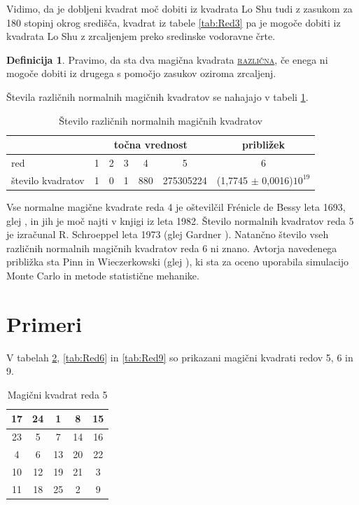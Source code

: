 \documentclass[a4paper,12pt]{article}
\newcommand{\pojem}[1]{\underline{\textsc{#1}}}
\theoremstyle{definition}
\newtheorem{definicija}{Definicija}
\theoremstyle{plain}
\newenvironment{magic}[3]{
   \begin{table}[!ht]%
   \centering%
   \caption{#2}%
   \label{#3}%
   \large
   \begin{tabular}{|*{#1}{c|}}%
      \hline
}{
   \end{tabular}%
   \end{table}%
}
\begin{document}
Vidimo, da je dobljeni kvadrat moč dobiti iz kvadrata Lo Shu tudi z zasukom za
180 stopinj okrog središča, kvadrat iz tabele \ref{tab:Red3} pa je mogoče dobiti
iz kvadrata Lo Shu z zrcaljenjem preko sredinske vodoravne črte.

\begin{definicija}
   Pravimo, da sta dva magična kvadrata \pojem{različna}, če enega ni mogoče dobiti
   iz drugega s pomočjo zasukov oziroma zrcaljenj.
\end{definicija}
\pagebreak

Števila različnih normalnih magičnih kvadratov se nahajajo v tabeli \ref{tab:razlicni}.

\begin{table}[!h]
   \centering
   \caption{Število različnih normalnih magičnih kvadratov}
   \label{tab:razlicni}
   \begin{tabular}{|l|*{6}{c|}}
      \hline
                        & \multicolumn{5}{c|}{točna vrednost} & približek                      \\\hline
      red               & 1 & 2 & 3 & 4   & 5                 & 6                              \\\hline
      število kvadratov & 1 & 0 & 1 & 880 & 275305224         & (1,7745 $\pm$ 0,0016)$10^{19}$ \\\hline
   \end{tabular}
\end{table}

Vse normalne magične kvadrate reda 4 je oštevilčil Frénicle de Bessy
leta 1693, glej \cite{bessy}, in jih je moč najti v knjigi \cite{berlekamp}
iz leta 1982. Število normalnih kvadratov reda 5 je izračunal
R. Schroeppel leta 1973 (glej Gardner \cite{gardner}).
Natančno število vseh različnih normalnih magičnih kvadratov reda 6 ni znano.
Avtorja navedenega približka sta Pinn in Wieczerkowski (glej \cite{pinn}), ki
sta za oceno uporabila simulacijo Monte Carlo in metode statistične mehanike.


\section{Primeri}

V tabelah \ref{tab:Red5}, \ref{tab:Red6} in \ref{tab:Red9} so prikazani
magični kvadrati redov 5, 6 in 9.

\begin{magic}{5}{Magični kvadrat reda 5}{tab:Red5}
   17 & 24 &  1 &  8 & 15 \\\hline
   23 &  5 &  7 & 14 & 16 \\\hline
    4 &  6 & 13 & 20 & 22 \\\hline
   10 & 12 & 19 & 21 &  3 \\\hline
   11 & 18 & 25 &  2 &  9 \\\hline
\end{magic}
\end{document}
